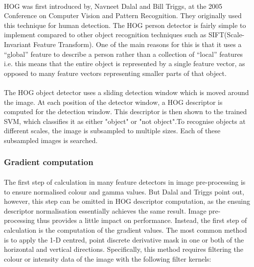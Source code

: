 	\paragraph{}HOG was first introduced by, Navneet Dalal and Bill Triggs, at the 2005 Conference on Computer Vision and Pattern Recognition. They originally used this technique for human detection. The HOG person detector is fairly simple to implement compared to other object recognition techniques such as SIFT(Scale-Invariant Feature Transform). One of the main reasons for this is that it uses a “global” feature to describe a person rather than a collection of “local” features i.e. this means that the entire object is represented by a single feature vector, as opposed to many feature vectors representing smaller parts of that object.
	
	\paragraph{}The HOG object detector uses a sliding detection window which is moved around the image. At each position of the detector window, a HOG descriptor is computed for the detection window. This descriptor is then shown to the trained SVM, which classifies it as either "object" or "not object".To recognise objects at different scales, the image is subsampled to multiple sizes. Each of these subsampled images is searched.
	
		\subsubsection{Gradient computation}
		\paragraph{}The first step of calculation in many feature detectors in image pre-processing is to ensure normalised colour and gamma values. But Dalal and Triggs point out, however, this step can be omitted in HOG descriptor computation, as the ensuing descriptor normalisation essentially achieves the same result. Image pre-processing thus provides a little impact on performance. Instead, the first step of calculation is the computation of the gradient values. The most common method is to apply the 1-D centred, point discrete derivative mask in one or both of the horizontal and vertical directions. Specifically, this method requires filtering the colour or intensity data of the image with the following filter kernels:
				
